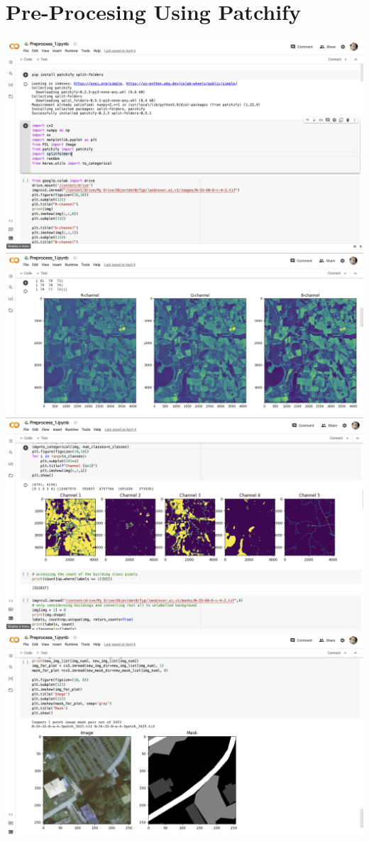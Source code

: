 \section{Pre-Procesing Using Patchify}
\includegraphics[scale=0.4]{screenshts/5.png}
\includegraphics[scale=0.4]{screenshts/6.png}
\includegraphics[scale=0.34]{screenshts/7.png}
\includegraphics[scale=0.34]{screenshts/9.png}
